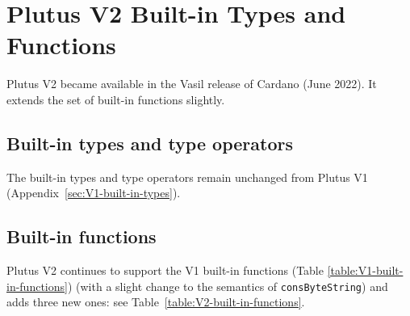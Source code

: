 \renewcommand{\note}[1]{
  \bigskip
  \refstepcounter{notenumberB}
  \noindent\textbf{Note \thenotenumberB. #1}
}

\newpage

\section{Plutus V2 Built-in Types and Functions}
\label{appendix:default-builtins-V2}
Plutus V2 became available in the Vasil release of Cardano (June 2022). It
extends the set of built-in functions slightly.

\subsection{Built-in types and type operators}
\label{sec:V2-built-in-types} 
The built-in types and type operators remain unchanged from Plutus V1
(Appendix~\ref{sec:V1-built-in-types}).

\subsection{Built-in functions}
\label{sec:V2-built-in-functions}
Plutus V2 continues to support the V1 built-in functions (Table
\ref{table:V1-built-in-functions}) (with a slight change to the semantics of \texttt{consByteString})
and adds three new ones: see Table~\ref{table:V2-built-in-functions}.

